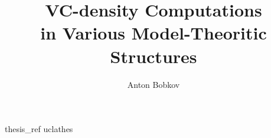 \documentclass [PhD] {uclathes}
\title          {VC-density Computations \\
                in Various Model-Theoritic Structures}
\author         {Anton Bobkov}
\begin{document}
 
\makeintropages




 


 
 {thesis_ref}    %
 {uclathes} 
   
\end{document}
